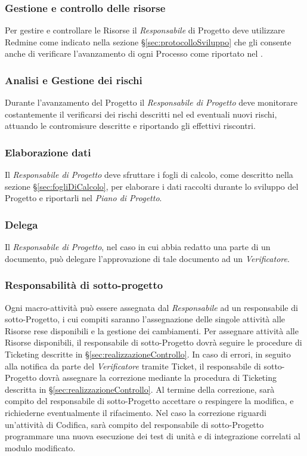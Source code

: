 \subsubsection{Gestione e controllo delle risorse}
Per gestire e controllare le Risorse il \emph{Responsabile} di Progetto deve utilizzare Redmine come indicato nella sezione \S\ref{sec:protocolloSviluppo} che gli consente anche di verificare l’avanzamento di ogni Processo come riportato nel \href{run:../../Esterni/\fPianoDiProgetto}{\fEscapePianoDiProgetto} .
\subsubsection{Analisi e Gestione dei rischi}
Durante l’avanzamento del Progetto il \emph{Responsabile di Progetto} deve monitorare costantemente il verificarsi dei rischi descritti nel \href{run:../../Esterni/\fPianoDiProgetto}{\fEscapePianoDiProgetto} ed eventuali nuovi rischi, attuando le contromisure descritte e riportando gli effettivi riscontri.

\subsubsection{Elaborazione dati}
Il \emph{Responsabile di Progetto} deve sfruttare i fogli di calcolo, come descritto nella sezione \S\ref{sec:fogliDiCalcolo}, per elaborare i dati raccolti durante lo sviluppo del Progetto e riportarli nel \emph{Piano di Progetto}.

\subsubsection{Delega}
\label{sec:delega}
Il \emph{Responsabile di Progetto}, nel caso in cui abbia redatto una parte di un documento, può delegare l'approvazione di tale documento ad un \emph{Verificatore}.
\subsubsection{Responsabilità di sotto-progetto}
Ogni macro-attività può essere assegnata dal \emph{Responsabile} ad un responsabile di sotto-Progetto, i cui compiti saranno l’assegnazione delle singole attività alle Risorse rese disponibili e la gestione dei cambiamenti.
Per assegnare attività alle Risorse disponibili, il responsabile di sotto-Progetto dovrà seguire le procedure di Ticketing descritte in \S\ref{sec:realizzazioneControllo}.
In caso di errori, in seguito alla notifica da parte del \emph{Verificatore} tramite Ticket, il responsabile di sotto-Progetto dovrà assegnare la correzione mediante la procedura di Ticketing descritta in \S\ref{sec:realizzazioneControllo}. Al termine della correzione, sarà compito del responsabile di sotto-Progetto accettare o respingere la modifica, e richiederne eventualmente il rifacimento.
Nel caso la correzione riguardi un’attività di Codifica, sarà compito del responsabile di sotto-Progetto programmare una nuova esecuzione dei test di unità e di integrazione correlati al modulo modificato.

